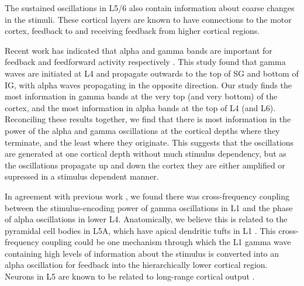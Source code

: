 The sustained oscillations in \acs{L5}/6 also contain information about coarse changes in the stimuli.
These cortical layers are known to have connections to the motor cortex, feedback to  and receiving feedback from higher cortical regions.


Recent work has indicated that alpha and gamma bands are important for feedback and feedforward activity respectively \citep{VanKerkoerle2014}.
This study \citep{VanKerkoerle2014} found that gamma waves are initiated at \ac{L4} and propagate outwards to the top of \ac{SG} and bottom of \ac{IG}, with alpha waves propagating in the opposite direction.
Our study finds the most information in gamma bands at the very top (and very bottom) of the cortex, and the most information in alpha bands at the top of \ac{L4} (and \ac{L6}).
Reconciling these results together, we find that there is most information in the power of the alpha and gamma oscillations at the cortical depths where they terminate, and the least where they originate.
This suggests that the oscillations are generated at one cortical depth without much stimulus dependency, but as the oscillations propagate up and down the cortex they are either amplified or supressed in a stimulus dependent manner.

In agreement with previous work \citep{Spaak2012}, we found there was cross-frequency coupling between the stimulus-encoding power of gamma oscillations in \ac{L1} and the phase of alpha oscillations in lower \ac{L4}.
Anatomically, we believe this is related to the pyramidal cell bodies in \ac{L5A}, which have apical dendritic tufts in \ac{L1} \citep{Hill2013,Zhu2004}.
This cross-frequency coupling could be one mechanism through which the \ac{L1} gamma wave containing high levels of information about the stimulus is converted into an alpha oscillation for feedback into the hierarchically lower cortical region.
Neurons in \ac{L5} are known to be related to long-range cortical output \citep{Hill2013}.


